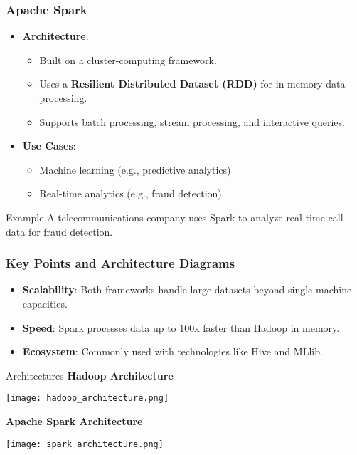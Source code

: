 \documentclass[aspectratio=169]{beamer}
\begin{document}
\begin{frame}[fragile]
    \frametitle{Apache Spark}
    \begin{itemize}
        \item \textbf{Architecture}:
        \begin{itemize}
            \item Built on a cluster-computing framework.
            \item Uses a \textbf{Resilient Distributed Dataset (RDD)} for in-memory data processing.
            \item Supports batch processing, stream processing, and interactive queries.
        \end{itemize}
        
        \item \textbf{Use Cases}:
        \begin{itemize}
            \item Machine learning (e.g., predictive analytics)
            \item Real-time analytics (e.g., fraud detection)
        \end{itemize}
    \end{itemize}

    \begin{block}{Example}
        A telecommunications company uses Spark to analyze real-time call data for fraud detection.
    \end{block}
\end{frame}

\begin{frame}[fragile]
    \frametitle{Key Points and Architecture Diagrams}
    \begin{itemize}
        \item \textbf{Scalability}:
        Both frameworks handle large datasets beyond single machine capacities.
        
        \item \textbf{Speed}:
        Spark processes data up to 100x faster than Hadoop in memory.
        
        \item \textbf{Ecosystem}:
        Commonly used with technologies like Hive and MLlib.
    \end{itemize}

    \begin{block}{Architectures}
        \textbf{Hadoop Architecture}
        \begin{center}
            \texttt{[image: hadoop\_architecture.png]} 
        \end{center}
        
        \textbf{Apache Spark Architecture}
        \begin{center}
            \texttt{[image: spark\_architecture.png]} 
        \end{center}
    \end{block}
\end{frame}
\end{document}
